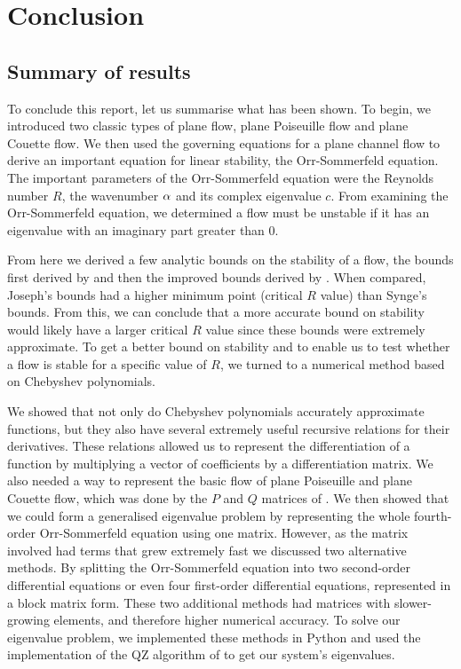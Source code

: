 \chapter{Conclusion}
\label{chap:conc}

\section{Summary of results}
To conclude this report, let us summarise what has been shown. To begin, we introduced two classic types of plane flow, plane Poiseuille flow and plane Couette flow. We then used the governing equations for a plane channel flow to derive an important equation for linear stability, the Orr-Sommerfeld equation. The important parameters of the Orr-Sommerfeld equation were the Reynolds number $R$, the wavenumber $\alpha$ and its complex eigenvalue $ c$. From examining the Orr-Sommerfeld equation, we determined a flow must be unstable if it has an eigenvalue with an imaginary part greater than $0$.

From here we derived a few analytic bounds on the stability of a flow, the bounds first derived by \citet{synge1938hydrodynamical} and then the improved bounds derived by \citet{joseph1968eigenvalue, joseph1969eigenvalue}. When compared, Joseph's bounds had a higher minimum point (critical $R$ value) than Synge's bounds. From this, we can conclude that a more accurate bound on stability would likely have a larger critical $ R$ value since these bounds were extremely approximate. To get a better bound on stability and to enable us to test whether a flow is stable for a specific value of $R$, we turned to a numerical method based on Chebyshev polynomials.

We showed that not only do Chebyshev polynomials accurately approximate functions, but they also have several extremely useful recursive relations for their derivatives. These relations allowed us to represent the differentiation of a function by multiplying a vector of coefficients by a differentiation matrix. We also needed a way to represent the basic flow of plane Poiseuille and plane Couette flow, which was done by the  $P $ and $Q $ matrices of \citet{bukhari1997spectral}. We then showed that we could form a generalised eigenvalue problem by representing the whole fourth-order Orr-Sommerfeld equation using one matrix. However, as the matrix involved had terms that grew extremely fast we discussed two alternative methods. By splitting the Orr-Sommerfeld equation into two second-order differential equations or even four first-order differential equations, represented in a block matrix form. These two additional methods had matrices with slower-growing elements, and therefore higher numerical accuracy. To solve our eigenvalue problem, we implemented these methods in Python and used the implementation of the QZ algorithm of \citet{moler1973algorithm} to get our system's eigenvalues.

